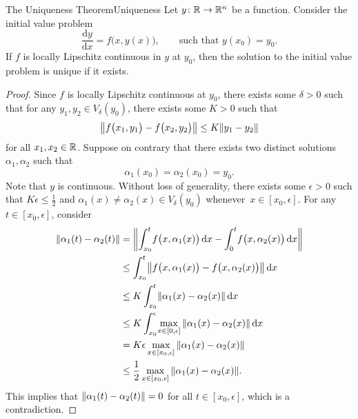 \documentclass[math, code]{amznotes}
\theoremstyle{remark}
\renewcommand{\d}{\mathrm{d}}
\begin{document}
\begin{thmbox}{The Uniqueness Theorem}{Uniqueness}
    Let $y \colon \mathbb{R} \to \mathbb{R}^n$ be a function. Consider the initial value problem 
    \begin{equation*}
        \frac{\d y}{\d x} = f\bigl(x, y(x)\bigr), \qquad \textrm{such that } y(x_0) = y_0.
    \end{equation*}
    If $f$ is locally Lipschitz continuous in $y$ at $y_0$, then the solution to the initial value problem is unique if it exists.
    \tcblower
    \begin{proof}
        Since $f$ is locally Lipschitz continuous at $y_0$, there exists some $\delta > 0$ such that for any $y_1, y_2 \in V_\delta(y_0)$, there exists some $K > 0$ such that 
        \begin{equation*}
            {\left\lVert {f\bigl(x_1, y_1\bigr) - f\bigl(x_2, y_2\bigr)} \right\rVert} \leq K{\left\lVert {y_1 - y_2} \right\rVert}
        \end{equation*}
        for all $x_1, x_2 \in \mathbb{R}$. Suppose on contrary that there exists two distinct solutions $\alpha_1, \alpha_2$ such that 
        \begin{equation*}
            \alpha_1(x_0) = \alpha_2(x_0) = y_0.
        \end{equation*}
        Note that $y$ is continuous. Without loss of generality, there exists some $\epsilon > 0$ such that $K\epsilon \leq \frac{1}{2}$ and $\alpha_1(x) \neq \alpha_2(x) \in V_\delta(y_0)$ whenever~$x \in [x_0, \epsilon]$. For any $t \in [x_0, \epsilon]$, consider 
        \begin{align*}
            \norm{\alpha_1(t) - \alpha_2(t)} & = \norm{\int_{x_0}^t\!f\bigl(x, \alpha_1(x)\bigr)\,\d x - \int_0^t\!f\bigl(x, \alpha_2(x)\bigr)\,\d x} \\
            & \leq \int_{x_0}^t\!\norm{f\bigl(x, \alpha_1(x)\bigr) - f\bigl(x, \alpha_2(x)\bigr)}\,\d x \\
            & \leq K\int_{x_0}^t\!\norm{\alpha_1(x) - \alpha_2(x)}\,\d x \\
            & \leq K\int_{x_0}^{\epsilon}\!\max_{x \in [0, \epsilon]}\norm{\alpha_1(x) - \alpha_2(x)}\,\d x \\
            & = K\epsilon\max_{x \in [x_0, \epsilon]}\norm{\alpha_1(x) - \alpha_2(x)} \\
            & \leq \frac{1}{2}\max_{x \in [x_0, \epsilon]}\norm{\alpha_1(x) - \alpha_2(x)}.
        \end{align*}
        This implies that ${\left\lVert {\alpha_1(t) - \alpha_2(t)} \right\rVert} = 0$ for all $t \in [x_0, \epsilon]$, which is a contradiction.
    \end{proof}
\end{thmbox}
\end{document}
